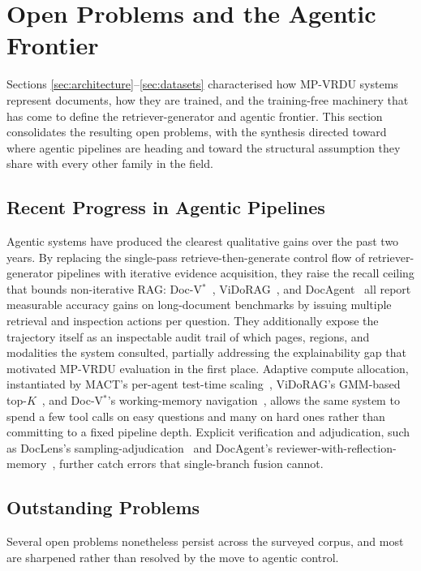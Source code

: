 \documentclass[11pt]{article}
\begin{document}
\section{Open Problems and the Agentic Frontier}
\label{sec:gaps}

Sections \ref{sec:architecture}--\ref{sec:datasets} characterised how MP-VRDU systems represent documents, how they are trained, and the training-free machinery that has come to define the retriever-generator and agentic frontier. This section consolidates the resulting open problems, with the synthesis directed toward where agentic pipelines are heading and toward the structural assumption they share with every other family in the field.

\subsection{Recent Progress in Agentic Pipelines}
Agentic systems have produced the clearest qualitative gains over the past two years. By replacing the single-pass retrieve-then-generate control flow of retriever-generator pipelines with iterative evidence acquisition, they raise the recall ceiling that bounds non-iterative RAG: Doc-V$^{*}$~\cite{zheng2026docvstar}, ViDoRAG~\cite{wang2025vidorag}, and DocAgent~\cite{sun2025docagent} all report measurable accuracy gains on long-document benchmarks by issuing multiple retrieval and inspection actions per question. They additionally expose the trajectory itself as an inspectable audit trail of which pages, regions, and modalities the system consulted, partially addressing the explainability gap that motivated MP-VRDU evaluation in the first place. Adaptive compute allocation, instantiated by MACT's per-agent test-time scaling~\cite{yu2025mact}, ViDoRAG's GMM-based top-$K$~\cite{wang2025vidorag}, and Doc-V$^{*}$'s working-memory navigation~\cite{zheng2026docvstar}, allows the same system to spend a few tool calls on easy questions and many on hard ones rather than committing to a fixed pipeline depth. Explicit verification and adjudication, such as DocLens's sampling-adjudication~\cite{zhu2025doclens} and DocAgent's reviewer-with-reflection-memory~\cite{sun2025docagent}, further catch errors that single-branch fusion cannot.

\subsection{Outstanding Problems}
Several open problems nonetheless persist across the surveyed corpus, and most are sharpened rather than resolved by the move to agentic control.
\end{document}
